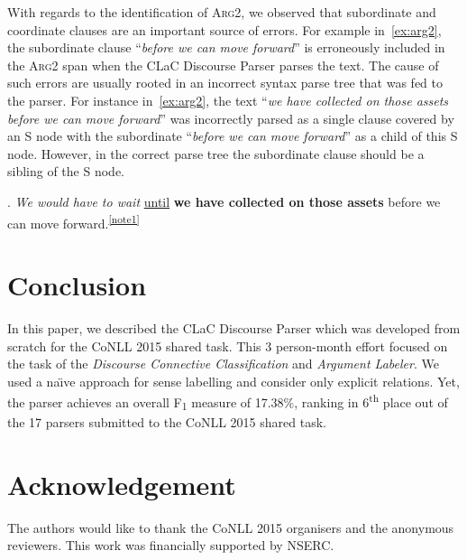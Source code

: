 \documentclass[11pt]{article}
\begin{document}
With regards to the identification of \textsc{Arg2}, we observed that subordinate and coordinate clauses are an important source of errors. For example in~\ref{ex:arg2}, the subordinate clause ``\textit{before we can move forward}'' is erroneously included in the \textsc{Arg2} span when the CLaC Discourse Parser parses the text. The cause of such errors are usually rooted in an incorrect syntax parse tree that was fed to the parser. For instance in~\ref{ex:arg2}, the text ``\textit{we have collected on those assets before we can move forward}'' was incorrectly parsed as a single clause covered by an S node with the subordinate ``\emph{before we can move forward}'' as a child of this S node. However, in the correct parse tree the subordinate clause should be a sibling of the S node.




\ex. \label{ex:arg2} \textit{We would have to wait} \underline{until} \textbf{we have collected on those assets} before we can move forward.\textsuperscript{\ref{note1}}

\section{Conclusion}
\label{sec:conclusion}

In this paper, we described the CLaC Discourse Parser which was developed from scratch for the CoNLL 2015 shared task. This 3 person-month effort focused on the task of the \textit{Discourse Connective Classification} and \textit{Argument Labeler}. We used a na\"\i ve approach for sense labelling and consider only explicit relations. Yet, the parser achieves an overall F\textsubscript{1} measure of 17.38\%, ranking in 6\textsuperscript{th} place out of the 17 parsers submitted to the CoNLL 2015 shared task.

\section{Acknowledgement}

The authors would like to thank the CoNLL 2015 organisers and the anonymous reviewers. This work was financially supported by NSERC. 




\end{document}
